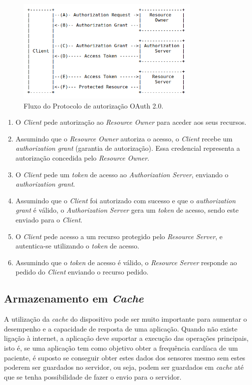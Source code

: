 \begin{figure}[H]
  \centering
  \includegraphics[width=0.8\textwidth]{imgs/oauth2flow.png}
  \caption[Fluxo do Protocolo 2.0]{Fluxo do Protocolo de autorização OAuth 2.0. \cite{oauth20}}
  \label{f:oauth2flow}
\end{figure}

\begin{enumerate}[label=(\Alph*)]
    \item O \textit{Client} pede autorização ao \textit{Resource Owner} para aceder aos seus recursos.
    \item Assumindo que o \textit{Resource Owner} autoriza o acesso, o \textit{Client} recebe um \textit{authorization grant} (garantia de autorização). Essa credencial representa a autorização concedida pelo \textit{Resource Owner}.
    \item O \textit{Client} pede um \textit{token} de acesso ao \textit{Authorization Server}, enviando o \textit{authorization grant}.
    \item Assumindo que o \textit{Client} foi autorizado com sucesso e que o \textit{authorization grant} é válido, o \textit{Authorization Server} gera um \textit{token} de acesso, sendo este enviado para o \textit{Client}.
    \item O \textit{Client} pede acesso a um recurso protegido pelo \textit{Resource Server}, e autentica-se utilizando o \textit{token} de acesso.
    \item Assumindo que o \textit{token} de acesso é válido, o \textit{Resource Server} responde ao pedido do \textit{Client} enviando o recurso pedido.
\end{enumerate}


\subsection{Armazenamento em \textit{Cache}}
A utilização da \textit{cache} do dispositivo pode ser muito importante para aumentar o desempenho e a capacidade de resposta de uma aplicação. Quando não existe ligação à internet, a aplicação deve suportar a execução das operações principais, isto é, se uma aplicação tem como objetivo obter a frequência cardíaca de um paciente, é suposto se conseguir obter estes dados dos sensores mesmo sem estes poderem ser guardados no servidor, ou seja, podem ser guardados em \textit{cache} até que se tenha possibilidade de fazer o envio para o servidor.


